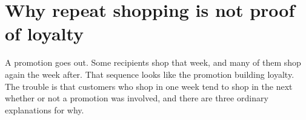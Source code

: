 \documentclass[11pt]{article}
\begin{document}
\newpage
\section{Why repeat shopping is not proof of loyalty}

A promotion goes out. Some recipients shop that week, and many of them shop again the week
after. That sequence looks like the promotion building loyalty. The trouble is
that customers who shop in one week tend to shop in the next whether or not a promotion was
involved, and there are three ordinary explanations for why.

\vspace{6pt}
\end{document}
